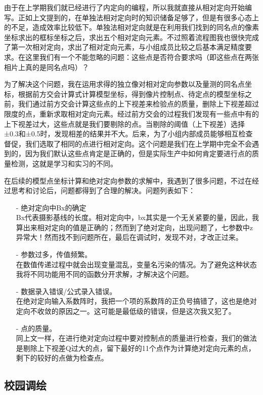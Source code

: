 由于在上学期我们就已经进行了内定向的编程，所以我就直接从相对定向开始编写。正如上文提到的，在单独法相对定向时的知识储备足够了，但是有很多心态上的不足，造成效率比较低下。单独法相对定向就是在利用我们找到的同名点的像素坐标求出的框标坐标之后，求出五个相对定向元素。不过照着流程图我也很快完成了第一次相对定向，求出了相对定向元素，与小组成员比较之后基本满足精度要求。在这里我们有一个不能忽略的问题：这些点是否符合要求吗（即这些点在两张相片上真的是同名点吗）？

为了解决这个问题，我在运用求得的独立像对相对定向参数以及量测的同名点坐标，根据前方交会计算式计算模型坐标，得到像片控制点、待定点的模型坐标之前，我们通过前方交会计算这些点的上下视差来检验点的质量，删除上下视差超过限度的点，重新求取相对定向元素。经过前方交会的过程我们发现有一些点中有的上下视差过大，这些点就是我们要剔除的点。当剔除的阈值（上下视差）选择±0.3和±0.5时，发现相差的结果并不大。后来，为了小组内部成员能够相互检查督促，我们选取了相同的点进行相对定向。这个问题是我们在上学期中完全不会遇到的，因为我们默认这些点肯定是正确的，但是实际生产中如何肯定要进行点的质量检测，这就是学习和实习的不同。

在后续的模型点坐标计算和绝对定向参数的求解中，我遇到了很多问题，不过在经过思考和讨论后，问题都得到了合理的解决。问题列表如下：
\begin{itemize}
	\item[-] 绝对定向中Bx的确定\\
	Bx代表摄影基线的长度。相对定向中，bx其实是一个无关紧要的量，因此，我算出来相对定向的值是正确的；然而到了绝对定向，出现问题了，七参数中z异常大！然而找不到问题所在，最后在调试时，发现不对，才改正过来。
	\item[-]参数过多，传值频繁。\\
	在数值传递过程中就会出现变量混乱，变量名污染的情况。为了避免这种状态我将不同功能用不同的函数分开求解，才解决这个问题。
	\item[-]数据录入错误/公式录入错误。\\
	在绝对定向输入系数阵时，我把一个项的系数阵的正负号搞错了，这也是绝对定向不收敛的原因之一。这可能是最低级的错误，但是这次我又犯了。
	\item[-]点的质量。\\
	同上文一样，在进行绝对定向过程中要对控制点的质量进行检查，我们的做法是剔除上下视差Q过大的点，留下最好的11个点作为计算绝对定向元素的点，剩下的较好的点做为检查点。
\end{itemize}

\subsection{校园调绘}

